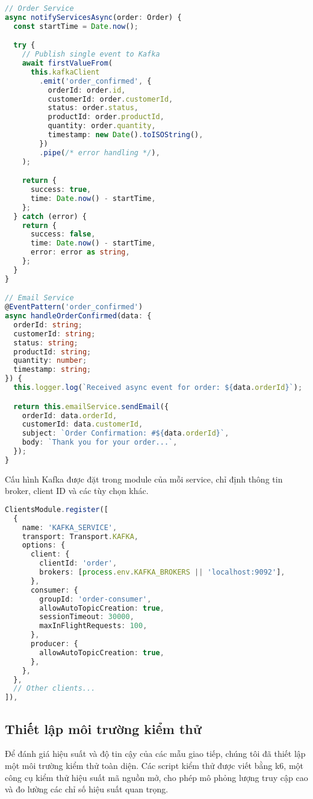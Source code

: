 \begin{lstlisting}[language=Typescript]
// Order Service
async notifyServicesAsync(order: Order) {
  const startTime = Date.now();

  try {
    // Publish single event to Kafka
    await firstValueFrom(
      this.kafkaClient
        .emit('order_confirmed', {
          orderId: order.id,
          customerId: order.customerId,
          status: order.status,
          productId: order.productId,
          quantity: order.quantity,
          timestamp: new Date().toISOString(),
        })
        .pipe(/* error handling */),
    );

    return {
      success: true,
      time: Date.now() - startTime,
    };
  } catch (error) {
    return {
      success: false,
      time: Date.now() - startTime,
      error: error as string,
    };
  }
}

// Email Service
@EventPattern('order_confirmed')
async handleOrderConfirmed(data: {
  orderId: string;
  customerId: string;
  status: string;
  productId: string;
  quantity: number;
  timestamp: string;
}) {
  this.logger.log(`Received async event for order: ${data.orderId}`);

  return this.emailService.sendEmail({
    orderId: data.orderId,
    customerId: data.customerId,
    subject: `Order Confirmation: #${data.orderId}`,
    body: `Thank you for your order...`,
  });
}
\end{lstlisting}

Cấu hình Kafka được đặt trong module của mỗi service, chỉ định thông tin broker, client ID và các tùy chọn khác.

\begin{lstlisting}[language=Typescript]
ClientsModule.register([
  {
    name: 'KAFKA_SERVICE',
    transport: Transport.KAFKA,
    options: {
      client: {
        clientId: 'order',
        brokers: [process.env.KAFKA_BROKERS || 'localhost:9092'],
      },
      consumer: {
        groupId: 'order-consumer',
        allowAutoTopicCreation: true,
        sessionTimeout: 30000,
        maxInFlightRequests: 100,
      },
      producer: {
        allowAutoTopicCreation: true,
      },
    },
  },
  // Other clients...
]),
\end{lstlisting}

\subsection{Thiết lập môi trường kiểm thử}
Để đánh giá hiệu suất và độ tin cậy của các mẫu giao tiếp, chúng tôi đã thiết lập một môi trường kiểm thử toàn diện. Các script kiểm thử được viết bằng k6, một công cụ kiểm thử hiệu suất mã nguồn mở, cho phép mô phỏng lượng truy cập cao và đo lường các chỉ số hiệu suất quan trọng.

